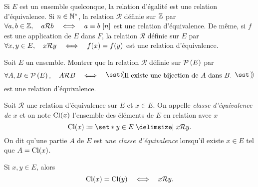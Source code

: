\documentclass{magnolia}
\begin{document}
\begin{remarqueUnique}
\remarque Si $E$ est un ensemble quelconque, la relation d'égalité est une
  relation d'équivalence. Si $n\in{\mathbb{N}^*}$, la relation $\mathcal{R}$ définie sur $\mathbb{Z}$ par
  \og $\forall a,b\in\mathbb{Z} ,\quad a\mathcal{R} b \quad\Longleftrightarrow\quad a\equiv b\ [n]$ \fg
  est une relation d'équivalence. De même, si $f$ est une application
  de $E$ dans $F$, la relation $\mathcal{R}$ définie sur $E$ par
  \og $\forall x,y\in E ,\quad x\mathcal{R}y \quad\Longleftrightarrow\quad f(x)=f(y)$ \fg
  est une relation d'équivalence.
\end{remarqueUnique}

\begin{exoUnique}
\exo Soit $E$ un ensemble. Montrer que la relation $\mathcal{R}$ définie
  sur $\mathcal{P}\left(E\right)$ par
  \[\forall A,B\in\parties{E} \qsep A\mathcal{R} B \quad\ssi\quad
    \text{\og Il existe une bijection de $A$ dans $B$. \fg}\]
  est une relation d'équivalence.
\end{exoUnique}


\begin{definition}[utile=-3]
Soit $\mathcal{R}$ une relation d'équivalence sur $E$ et $x\in E$. On appelle
\emph{classe d'équivalence de $x$} et on note ${\rm Cl}(x)$ l'ensemble des
éléments de $E$ en relation avec $x$
\[{\rm Cl}(x)\defeq\enstq{y\in E}{x\mathcal{R}y}.\]
On dit qu'une partie $A$ de $E$ est \emph{une classe d'équivalence} lorsqu'il existe
$x\in E$ tel que $A={\rm Cl}(x)$.
\end{definition}

\begin{remarqueUnique}
\remarque Si $x,y\in E$, alors
  \[{\rm Cl}(x)={\rm Cl}(y) \quad\Longleftrightarrow\quad x \mathcal{R} y.\]
\end{remarqueUnique}

\end{document}
